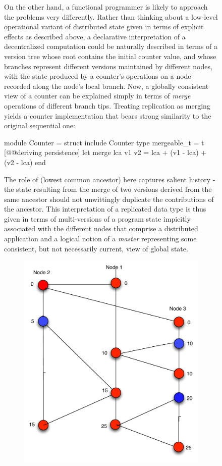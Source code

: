 \begin{figure}
On the other hand, a functional programmer is likely to approach the
problems very differently.  Rather than thinking about a low-level
operational variant of distributed state given in terms of explicit
effects as described above, a declarative interpretation of a
decentralized computation could be naturally described in terms of a
version tree whose root contains the initial counter value, and whose
branches represent different versions maintained by different nodes,
with the state produced by a counter's operations on a node recorded
along the node's local branch.  Now, a globally consistent view of a
counter can be explained simply in terms of \emph{merge} operations of
different branch tips.  Treating replication as merging yields a
counter implementation that bears strong similarity to the original
sequential one:
  \begin{ocaml}
    module Counter = struct
      include Counter
      type mergeable_t = t [@@deriving persistence]
      let merge lca v1 v2 = lca + (v1 - lca) + (v2 - lca)
    end
  \end{ocaml}
The role of  (lowest common ancestor) here captures salient
history - the state resulting from the merge of two versions derived
from the same ancestor should not unwittingly duplicate the
contributions of the ancestor.  This interpretation of a replicated
data type is thus given in terms of multi-versions of a program state
impicitly associated with the different nodes that comprise a
distributed application and a logical notion of a \emph{master}
representing some consistent, but not necessarily current, view of
global state.
\begin{figure}
  \begin{center}
    \includegraphics[scale=0.4]{Figures/dali-counter}

\end{center}
\end{figure}
\end{figure}
